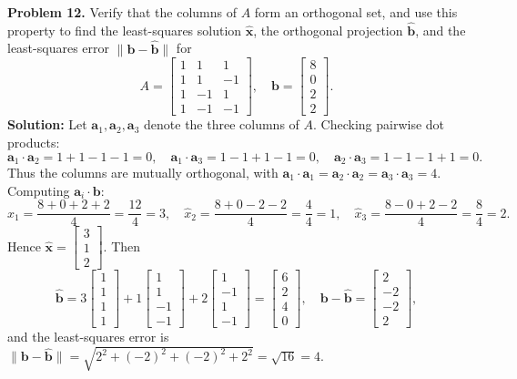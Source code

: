 \documentclass[11pt, letterpaper]{article}
\theoremstyle{definition}
\theoremstyle{remark}
\begin{document}
\textbf{Problem 12.} Verify that the columns of $A$ form an orthogonal set, and use this property to find the least-squares solution $\hat{\mathbf{x}}$, the orthogonal projection $\hat{\mathbf{b}}$, and the least-squares error $\|\mathbf{b} - \hat{\mathbf{b}}\|$ for
\[
A = \begin{bmatrix} 1 & 1 & 1 \\ 1 & 1 & -1 \\ 1 & -1 & 1 \\ 1 & -1 & -1 \end{bmatrix}, \quad \mathbf{b} = \begin{bmatrix} 8 \\ 0 \\ 2 \\ 2 \end{bmatrix}.
\]
\textbf{Solution:} Let $\mathbf{a}_1, \mathbf{a}_2, \mathbf{a}_3$ denote the three columns of $A$. Checking pairwise dot products:
\[
\mathbf{a}_1 \cdot \mathbf{a}_2 = 1+1-1-1 = 0, \quad \mathbf{a}_1 \cdot \mathbf{a}_3 = 1-1+1-1 = 0, \quad \mathbf{a}_2 \cdot \mathbf{a}_3 = 1-1-1+1 = 0.
\]
Thus the columns are mutually orthogonal, with $\mathbf{a}_1 \cdot \mathbf{a}_1 = \mathbf{a}_2 \cdot \mathbf{a}_2 = \mathbf{a}_3 \cdot \mathbf{a}_3 = 4$. Computing $\mathbf{a}_i \cdot \mathbf{b}$:
\[
\hat{x}_1 = \frac{8+0+2+2}{4} = \frac{12}{4} = 3, \quad \hat{x}_2 = \frac{8+0-2-2}{4} = \frac{4}{4} = 1, \quad \hat{x}_3 = \frac{8-0+2-2}{4} = \frac{8}{4} = 2.
\]
Hence $\hat{\mathbf{x}} = \begin{bmatrix} 3 \\ 1 \\ 2 \end{bmatrix}$. Then
\[
\hat{\mathbf{b}} = 3\begin{bmatrix} 1 \\ 1 \\ 1 \\ 1 \end{bmatrix} + 1\begin{bmatrix} 1 \\ 1 \\ -1 \\ -1 \end{bmatrix} + 2\begin{bmatrix} 1 \\ -1 \\ 1 \\ -1 \end{bmatrix} = \begin{bmatrix} 6 \\ 2 \\ 4 \\ 0 \end{bmatrix}, \quad \mathbf{b} - \hat{\mathbf{b}} = \begin{bmatrix} 2 \\ -2 \\ -2 \\ 2 \end{bmatrix},
\]
and the least-squares error is $\|\mathbf{b} - \hat{\mathbf{b}}\| = \sqrt{2^2 + (-2)^2 + (-2)^2 + 2^2} = \sqrt{16} = 4$.
\end{document}
